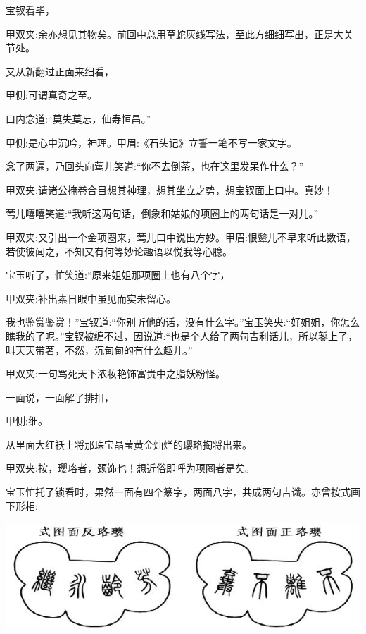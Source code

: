 \begin{parag}
    宝钗看毕，\begin{note}甲双夹:余亦想见其物矣。前回中总用草蛇灰线写法，至此方细细写出，正是大关节处。\end{note}又从新翻过正面来细看，\begin{note}甲侧:可谓真奇之至。\end{note}口内念道:“莫失莫忘，仙寿恒昌。”\begin{note}甲侧:是心中沉吟，神理。甲眉:《石头记》立誓一笔不写一家文字。\end{note}念了两遍，乃回头向莺儿笑道:“你不去倒茶，也在这里发呆作什么？”\begin{note}甲双夹:请诸公掩卷合目想其神理，想其坐立之势，想宝钗面上口中。真妙！\end{note}莺儿嘻嘻笑道:“我听这两句话，倒象和姑娘的项圈上的两句话是一对儿。”\begin{note}甲双夹:又引出一个金项圈来，莺儿口中说出方妙。甲眉:恨颦儿不早来听此数语，若使彼闻之，不知又有何等妙论趣语以悦我等心臆。\end{note}宝玉听了，忙笑道:“原来姐姐那项圈上也有八个字，\begin{note}甲双夹:补出素日眼中虽见而实未留心。\end{note}我也鉴赏鉴赏！”宝钗道:“你别听他的话，没有什么字。”宝玉笑央:“好姐姐，你怎么瞧我的了呢。”宝钗被缠不过，因说道:“也是个人给了两句吉利话儿，所以錾上了，叫天天带著，不然，沉甸甸的有什么趣儿。”\begin{note}甲双夹:一句骂死天下浓妆艳饰富贵中之脂妖粉怪。\end{note}一面说，一面解了排扣，\begin{note}甲侧:细。\end{note}从里面大红袄上将那珠宝晶莹黄金灿烂的璎珞掏将出来。\begin{note}甲双夹:按，璎珞者，颈饰也！想近俗即呼为项圈者是矣。\end{note}宝玉忙托了锁看时，果然一面有四个篆字，两面八字，共成两句吉谶。亦曾按式画下形相:
\end{parag}

\includegraphics[]{1-80/8-2}


